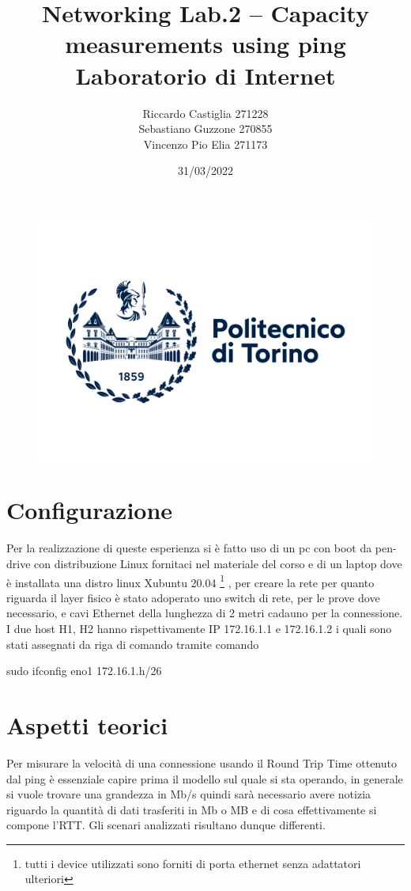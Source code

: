 \documentclass{article}
\title{Networking Lab.2 – Capacity measurements using ping
\\ Laboratorio di Internet}
\author{Riccardo Castiglia 271228 \\  Sebastiano Guzzone 270855 \\ Vincenzo Pio Elia 271173}
\date{31/03/2022}
\begin{document}
\begin{figure}
\centering
\includegraphics[scale=0.125]{polito_logo_2021_blu.jpg}


\end{figure}
\maketitle
\thispagestyle{empty}

\newpage
\tableofcontents %
\setcounter{page}{1}

\newpage

\section{Configurazione}
Per la realizzazione di queste esperienza si è fatto uso di un pc con boot da pen-drive con distribuzione Linux fornitaci nel materiale del corso e di un laptop dove è installata una distro linux Xubuntu 20.04 \footnote{tutti i device utilizzati sono forniti di porta ethernet senza adattatori ulteriori} , per creare la rete per quanto riguarda il layer fisico è stato adoperato uno switch di rete, per le prove dove necessario, e cavi Ethernet della lunghezza di 2 metri cadauno per la connessione.
I due host H1, H2 hanno rispettivamente IP 172.16.1.1 e 172.16.1.2 i quali sono stati assegnati da riga di comando tramite comando 
\begin{center}
    \textsf{ sudo ifconfig eno1 172.16.1.h/26}
\end{center}


\section{Aspetti teorici}
Per misurare la velocità di una connessione usando il Round Trip Time ottenuto dal ping è essenziale capire prima il modello sul quale si sta operando, in generale si vuole trovare una grandezza in Mb/s quindi sarà necessario avere notizia riguardo la quantità di dati trasferiti in Mb o MB e di cosa effettivamente si compone l'RTT.
Gli scenari analizzati risultano dunque differenti.
\end{document}
